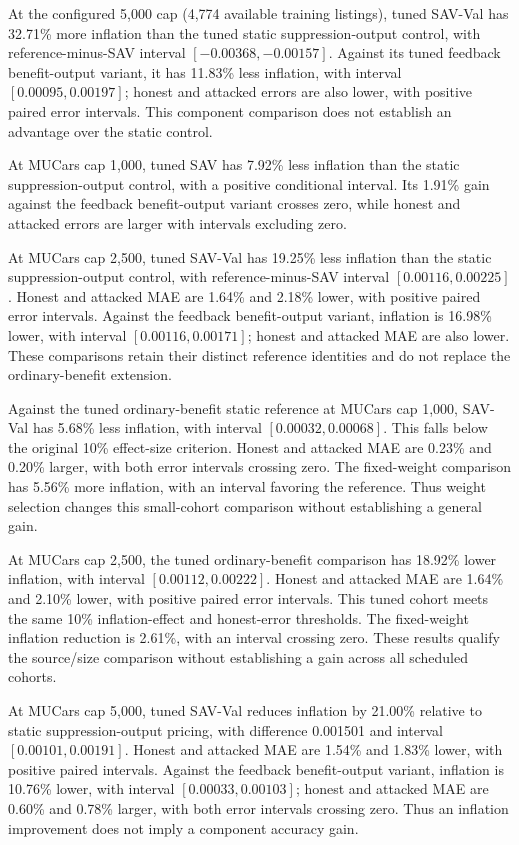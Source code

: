 At the configured 5,000 cap (4,774 available training listings), tuned SAV-Val
has 32.71\% more inflation than the tuned static suppression-output control,
with reference-minus-SAV interval $[-0.00368,-0.00157]$. Against its tuned
feedback benefit-output variant, it has 11.83\% less inflation, with interval
$[0.00095,0.00197]$; honest and attacked errors are also lower, with positive
paired error intervals. This component comparison does not establish an
advantage over the static control.

At MUCars cap 1,000, tuned SAV has 7.92\% less inflation than the static
suppression-output control, with a positive conditional interval. Its
1.91\% gain against the feedback benefit-output variant crosses zero,
while honest and attacked errors are larger with intervals excluding zero.

At MUCars cap 2,500, tuned SAV-Val has 19.25\% less inflation than the
static suppression-output control, with reference-minus-SAV interval
$[0.00116,0.00225]$. Honest and attacked MAE are 1.64\% and 2.18\% lower,
with positive paired error intervals. Against the feedback benefit-output
variant, inflation is 16.98\% lower, with interval $[0.00116,0.00171]$;
honest and attacked MAE are also lower. These comparisons retain their
distinct reference identities and do not replace the ordinary-benefit
extension.

Against the tuned ordinary-benefit static reference at MUCars cap 1,000,
SAV-Val has 5.68\% less inflation, with interval $[0.00032,0.00068]$.
This falls below the original 10\% effect-size criterion. Honest and attacked
MAE are 0.23\% and 0.20\% larger, with both error intervals crossing zero.
The fixed-weight comparison has 5.56\% more inflation, with an interval
favoring the reference. Thus weight selection changes this small-cohort
comparison without establishing a general gain.

At MUCars cap 2,500, the tuned ordinary-benefit comparison has 18.92\% lower inflation, with interval $[0.00112,0.00222]$. Honest and attacked MAE are 1.64\% and 2.10\% lower, with positive paired error intervals. This tuned cohort meets the same 10\% inflation-effect and honest-error thresholds. The fixed-weight inflation reduction is 2.61\%, with an interval crossing zero. These results qualify the source/size comparison without establishing a gain across all scheduled cohorts.

At MUCars cap 5,000, tuned SAV-Val reduces inflation by 21.00\% relative to
static suppression-output pricing, with difference 0.001501 and interval
$[0.00101,0.00191]$. Honest and attacked MAE are 1.54\% and 1.83\% lower,
with positive paired intervals. Against the feedback benefit-output variant,
inflation is 10.76\% lower, with interval $[0.00033,0.00103]$; honest and
attacked MAE are 0.60\% and 0.78\% larger, with both error intervals crossing
zero. Thus an inflation improvement does not imply a component accuracy gain.


